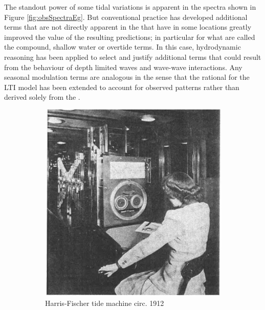 The standout power of some tidal variations is apparent in the spectra shown in Figure \ref{fig:obsSpectraEg}. 
But conventional practice has developed additional terms that are not directly apparent in the \ATGP{} that have in some locations greatly improved the value of the resulting predictions; in particular for what are called the compound, shallow water or overtide terms. In this case, hydrodynamic reasoning has been applied to select and justify additional terms that could result from the behaviour of depth limited waves and wave-wave interactions.
Any seasonal modulation terms are analogous in the sense that the rational for the LTI model has been extended to account for observed patterns rather than derived solely from the \ATGP{}.
\begin{figure}[!hbt] \centering
	\begin{subfigure}[t]{\figwidthHalf}
	    \includegraphics[width=\textwidth]{figures/images/zetler_tidal_computer_lady_1921.png}
	    \caption{Harris-Fischer tide machine circ. 1912 }
    \end{subfigure}
    \hfill
    \begin{subfigure}[t]{\figwidthHalf}

\end{subfigure}
\end{figure}
